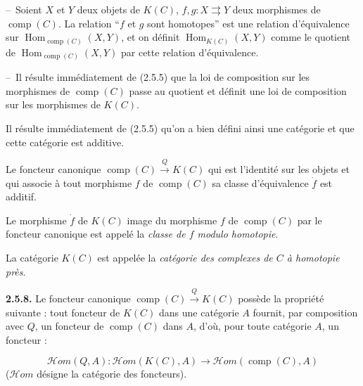 %
\noindent\hspace*{2em}--\ Soient $X$ et $Y$ deux objets de $K(C)$,
$f,g\colon X\rightrightarrows Y$ deux morphismes de
$\operatorname{comp}(C)$. La relation ``$f$ et $g$ sont homotopes'' est une
relation d'équivalence sur
$\operatorname{Hom}_{\operatorname{comp}(C)}(X,Y)$, et on définit
$\operatorname{Hom}_{K(C)}(X,Y)$ comme le quotient de
$\operatorname{Hom}_{\operatorname{comp}(C)}(X,Y)$ par cette relation
d'équivalence.

\noindent\hspace*{2em}--\ Il résulte immédiatement de (2.5.5) que la loi de
composition sur les morphismes de $\operatorname{comp}(C)$ passe au quotient
et définit une loi de composition sur les morphismes de $K(C)$.

Il résulte immédiatement de (2.5.5) qu'on a bien défini ainsi une catégorie et
que cette catégorie est additive.

Le foncteur canonique
$\operatorname{comp}(C)\xrightarrow{Q}K(C)$ qui est l'identité sur les objets
et qui associe à tout morphisme $f$ de $\operatorname{comp}(C)$ sa classe
d'équivalence $\dot f$ est additif.

Le morphisme $\dot f$ de $K(C)$ image du morphisme $f$ de
$\operatorname{comp}(C)$ par le foncteur canonique est appelé la
\emph{classe de $f$ modulo homotopie}.

La catégorie $K(C)$ est appelée la \emph{catégorie des complexes de $C$ à
homotopie près}.

\noindent\textbf{2.5.8.}\quad
Le foncteur canonique $\operatorname{comp}(C)\xrightarrow{Q}K(C)$ possède la
propriété suivante : tout foncteur de $K(C)$ dans une catégorie $A$ fournit,
par composition avec $Q$, un foncteur de $\operatorname{comp}(C)$ dans $A$,
d'où, pour toute catégorie $A$, un foncteur :

\begin{equation*}
  \mathcal H\!om(Q,A)\colon
  \mathcal H\!om(K(C),A)
  \longrightarrow
  \mathcal H\!om(\operatorname{comp}(C),A)
\end{equation*}
($\mathcal H\!om$ désigne la catégorie des foncteurs).

